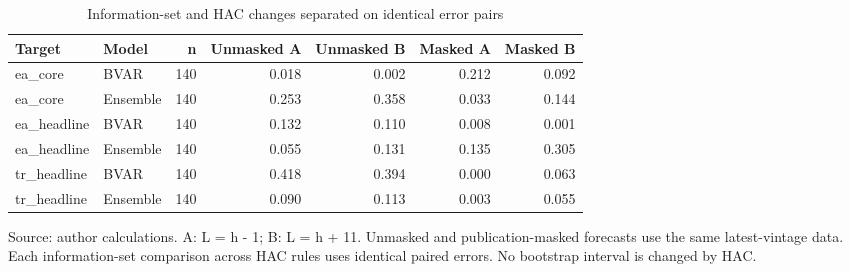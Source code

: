 \begin{table}[htbp]
\centering
\footnotesize
\caption{Information-set and HAC changes separated on identical error pairs}
\begin{tabularx}{\linewidth}{Xlrrrrr}
\toprule
Target & Model & n & Unmasked A & Unmasked B & Masked A & Masked B \\
\midrule
ea\_\allowbreak{}core & BVAR & 140 & 0.018 & 0.002 & 0.212 & 0.092 \\
ea\_\allowbreak{}core & Ensemble & 140 & 0.253 & 0.358 & 0.033 & 0.144 \\
ea\_\allowbreak{}headline & BVAR & 140 & 0.132 & 0.110 & 0.008 & 0.001 \\
ea\_\allowbreak{}headline & Ensemble & 140 & 0.055 & 0.131 & 0.135 & 0.305 \\
tr\_\allowbreak{}headline & BVAR & 140 & 0.418 & 0.394 & 0.000 & 0.063 \\
tr\_\allowbreak{}headline & Ensemble & 140 & 0.090 & 0.113 & 0.003 & 0.055 \\
\bottomrule
\end{tabularx}
\par\vspace{3pt}\begin{minipage}{\linewidth}\footnotesize Source: author calculations.\allowbreak{} A: L = h - 1; B: L = h + 11.\allowbreak{} Unmasked and publication-masked forecasts use the same latest-vintage data.\allowbreak{} Each information-set comparison across HAC rules uses identical paired errors.\allowbreak{} No bootstrap interval is changed by HAC.\allowbreak{}\end{minipage}
\end{table}
